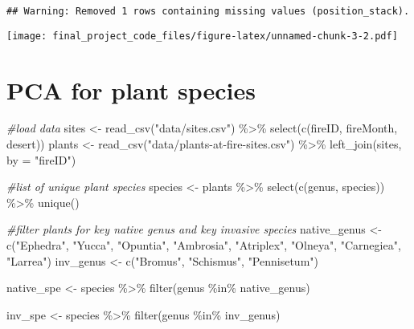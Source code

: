 \documentclass[
]{article}
\newenvironment{Shaded}{\begin{snugshade}}{\end{snugshade}}
\newcommand{\AttributeTok}[1]{\textcolor[rgb]{0.77,0.63,0.00}{#1}}
\newcommand{\CommentTok}[1]{\textcolor[rgb]{0.56,0.35,0.01}{\textit{#1}}}
\newcommand{\FunctionTok}[1]{\textcolor[rgb]{0.00,0.00,0.00}{#1}}
\newcommand{\NormalTok}[1]{#1}
\newcommand{\OtherTok}[1]{\textcolor[rgb]{0.56,0.35,0.01}{#1}}
\newcommand{\SpecialCharTok}[1]{\textcolor[rgb]{0.00,0.00,0.00}{#1}}
\newcommand{\StringTok}[1]{\textcolor[rgb]{0.31,0.60,0.02}{#1}}
\begin{document}
\begin{verbatim}
## Warning: Removed 1 rows containing missing values (position_stack).
\end{verbatim}

\texttt{[image: final\_project\_code\_files/figure-latex/unnamed-chunk-3-2.pdf]}

\hypertarget{pca-for-plant-species}{%
\section{PCA for plant species}\label{pca-for-plant-species}}

\begin{Shaded}
\begin{Highlighting}[]
\CommentTok{\#load data}
\NormalTok{sites }\OtherTok{\textless{}{-}} \FunctionTok{read\_csv}\NormalTok{(}\StringTok{"data/sites.csv"}\NormalTok{)  }\SpecialCharTok{\%\textgreater{}\%}
  \FunctionTok{select}\NormalTok{(}\FunctionTok{c}\NormalTok{(fireID, fireMonth, desert))}
\NormalTok{plants }\OtherTok{\textless{}{-}} \FunctionTok{read\_csv}\NormalTok{(}\StringTok{"data/plants{-}at{-}fire{-}sites.csv"}\NormalTok{) }\SpecialCharTok{\%\textgreater{}\%} 
  \FunctionTok{left\_join}\NormalTok{(sites, }\AttributeTok{by =} \StringTok{"fireID"}\NormalTok{)}

\CommentTok{\#list of unique plant species}
\NormalTok{species }\OtherTok{\textless{}{-}}\NormalTok{ plants }\SpecialCharTok{\%\textgreater{}\%} \FunctionTok{select}\NormalTok{(}\FunctionTok{c}\NormalTok{(genus, species)) }\SpecialCharTok{\%\textgreater{}\%} 
  \FunctionTok{unique}\NormalTok{()}

\CommentTok{\#filter plants for key native genus and key invasive species}
\NormalTok{native\_genus }\OtherTok{\textless{}{-}} \FunctionTok{c}\NormalTok{(}\StringTok{"Ephedra"}\NormalTok{, }\StringTok{"Yucca"}\NormalTok{, }\StringTok{"Opuntia"}\NormalTok{, }\StringTok{"Ambrosia"}\NormalTok{, }\StringTok{"Atriplex"}\NormalTok{, }\StringTok{"Olneya"}\NormalTok{, }\StringTok{"Carnegiea"}\NormalTok{, }\StringTok{"Larrea"}\NormalTok{)}
\NormalTok{inv\_genus }\OtherTok{\textless{}{-}} \FunctionTok{c}\NormalTok{(}\StringTok{"Bromus"}\NormalTok{, }\StringTok{"Schismus"}\NormalTok{, }\StringTok{"Pennisetum"}\NormalTok{)}

\NormalTok{native\_spe }\OtherTok{\textless{}{-}}\NormalTok{ species }\SpecialCharTok{\%\textgreater{}\%} 
  \FunctionTok{filter}\NormalTok{(genus }\SpecialCharTok{\%in\%}\NormalTok{ native\_genus)}

\NormalTok{inv\_spe }\OtherTok{\textless{}{-}}\NormalTok{ species }\SpecialCharTok{\%\textgreater{}\%} 
  \FunctionTok{filter}\NormalTok{(genus }\SpecialCharTok{\%in\%}\NormalTok{ inv\_genus)}


\end{Highlighting}
\end{Shaded}
\end{document}
